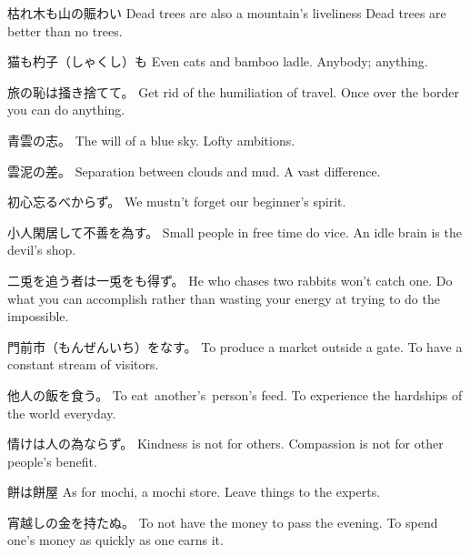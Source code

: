 \par{枯れ木も山の賑わい \hfill\break
Dead trees are also a mountain's liveliness \hfill\break
Dead trees are better than no trees. }

\par{猫も杓子（しゃくし）も \hfill\break
Even cats and bamboo ladle. \hfill\break
Anybody; anything. \hfill\break
}

\par{旅の恥は掻き捨てて。 \hfill\break
Get rid of the humiliation of travel. \hfill\break
Once over the border you can do anything. \hfill\break
}

\par{青雲の志。 \hfill\break
The will of a blue sky. \hfill\break
Lofty ambitions. }

\par{雲泥の差。 \hfill\break
Separation between clouds and mud. \hfill\break
A vast difference. }

\par{初心忘るべからず。 \hfill\break
We mustn't forget our beginner's spirit. }

\par{ 小人閑居して不善を為す。 \hfill\break
Small people in free time do vice. \hfill\break
An idle brain is the devil's shop. }

\par{二兎を追う者は一兎をも得ず。 \hfill\break
He who chases two rabbits won't catch one. \hfill\break
Do what you can accomplish rather than wasting your energy at trying to do the impossible. }

\par{門前市（もんぜんいち）をなす。 \hfill\break
To produce a market outside a gate. \hfill\break
To have a constant stream of visitors. }

\par{他人の飯を食う。 \hfill\break
To eat another's person's feed. \hfill\break
To experience the hardships of the world everyday. }

\par{情けは人の為ならず。 \hfill\break
Kindness is not for others. \hfill\break
Compassion is not for other people's benefit. }

\par{餅は餅屋 \hfill\break
As for mochi, a mochi store. \hfill\break
Leave things to the experts. }

\par{宵越しの金を持たぬ。 \hfill\break
To not have the money to pass the evening. \hfill\break
To spend one's money as quickly as one earns it. }

